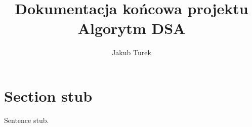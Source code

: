 \documentclass{article}
\title{Dokumentacja końcowa projektu \\ \Large{Algorytm DSA}}
\author{Jakub Turek}
\date{}
\begin{document}
    \maketitle

    \section*{Section stub}

    Sentence stub.
\end{document}
